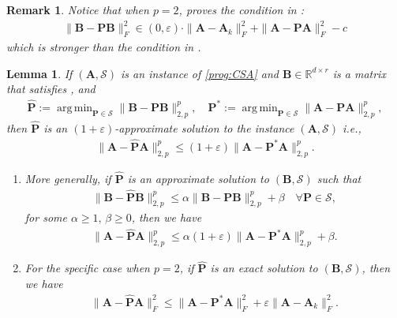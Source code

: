 \documentclass[11pt]{article}
\DeclareMathOperator*{\argmin}{arg\,min}
\theoremstyle{plain}
\newtheorem{lemma}[theorem]{Lemma}
\newtheorem{remark}[theorem]{Remark}
\theoremstyle{plain}
\theoremstyle{definition}
\theoremstyle{plain}
\theoremstyle{remark}
\newcommand{\RR}{\mathbb{R}}
\newcommand{\cS}{\mathcal{S}}
\begin{document}
\begin{remark}
\label{rem:stronger_PCPS_p=2}
    Notice that when $p=2$,  proves the condition in :
    \begin{align*}
\|\bm{B}-\bm{P}\bm{B}\|_F^2 \in (0,\varepsilon)\cdot\|\bm{A}-\bm{A}_k\|_F^2+ \|\bm{A}-\bm{P}\bm{A}\|_F^2 -c        
    \end{align*}
    which is stronger than the condition in .
\end{remark} 
\begin{lemma}
    \label{lem:approximate_soln}
    If $(\bm{A}, \cS)$ is an instance of \ref{prog:CSA} and $\bm{B}\in \RR^{d\times r}$ is a matrix that satisfies , and  
    \begin{align}
        \widehat{\bm{P}}:= \argmin_{\bm{P}\in \cS}\|\bm{B}-\bm{P}\bm{B}\|_{2,p}
^p ,\quad \bm{P}^*:= \argmin_{\bm{P}\in \cS}\|\bm{A}-\bm{P}\bm{A}\|_{2,p}
^p,
\end{align}
then $\widehat{\bm{P}}$ is an $(1+\varepsilon)$-approximate solution to the instance $(\bm{A}, \cS)$ i.e.,
\begin{align}
   \|\bm{A}-\widehat{\bm{P}}\bm{A}\|_{2,p}
^p\leq (1+\varepsilon)\|\bm{A}-\bm{P}^*\bm{A}\|_{2,p}
^p.
\end{align}
\begin{enumerate}
    \item More generally, if $\widehat{\bm{P}}$ is an approximate solution to $(\bm{B}, \cS)$ such that 
\begin{align*}
    \|\bm{B}-\widehat{\bm{P}}\bm{B}\|_{2,p}^p \leq \alpha \|\bm{B}-\bm{P}\bm{B}\|_{2,p}^p +\beta \quad \forall \bm{P} \in \cS,
\end{align*}
 for some $\alpha\geq 1,\, \beta\geq 0$, then we have 
\begin{align*}
    \|\bm{A}-\widehat{\bm{P}}\bm{A}\|_{2,p}
^p \leq \alpha(1+\varepsilon)\|\bm{A}-\bm{P}^*\bm{A}\|_{2,p}^p + \beta.
\end{align*}
\item For the specific case when $p=2$, if $\widehat{\bm{P}}$ is an exact solution to $(\bm{B}, \cS)$, then we have 
\begin{align*}
     \|\bm{A}-\widehat{\bm{P}}\bm{A}\|_F^2
 \leq \|\bm{A}-\bm{P}^*\bm{A}\|_F^2 + \varepsilon\|\bm{A}-\bm{A}_k\|_F^2.
\end{align*}
\end{enumerate}

\end{lemma}
\end{document}
